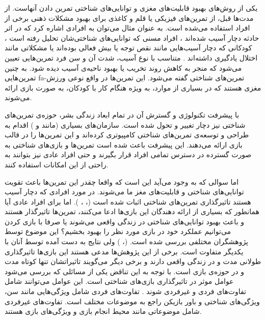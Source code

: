 \documentclass[twoside, a4paper,11pt]{book}
\numberwithin{equation}{chapter}
\numberwithin{table}{chapter}
\numberwithin{figure}{chapter}
\numberwithin{equation}{chapter}
\newcommand{\mls}[1]{\gls{fa-#1}\glsuseri{la-#1}}
\begin{document}
یکی از روش‌های بهبود قابلیت‌های مغزی و توانایی‌های شناختی تمرین دادن آنهاست. از مدت‌ها قبل، از تمرین‌های فیزیکی یا قلم و کاغذی برای بهبود مشکلات ذهنی برخی از افراد استفاده می‌شده است. به عنوان مثال می‌توان به افرادی اشاره کرد که در اثر حادثه دچار آسیب شده‌اند \cite{carney1999TBI}، افراد مسنی که توانایی‌های شناختی‌شان تحلیل رفته است \cite{rapp2002olderAdults}، کودکانی که دچار آسیب‌هایی مانند نقص توجه یا بیش فعالی بوده‌اند یا مشکلاتی مانند اختلال یادگیری داشته‌اند \cite{kimberly1999ADHDKids}. متناسب با نوع آسیب، شدت آن و سن فرد تمرین‌هایی تعیین می‌شود که منجر به کاهش روند تخریب یا بهبود ناحیه‌ی آسیب دیده شود. به چنین تمرین‌هایی  \mls{تمرین‌های شناختی} گفته می‌شود. این تمرین‌ها در واقع نوعی ورزش مغزی هستند که در بسیاری از موارد، به ویژه هنگام کار با کودکان، به صورت بازی ارائه می‌شوند.

با پیشرفت تکنولوژی و گسترش آن در تمام ابعاد زندگی بشر، حوزه‌ی تمرین‌های شناختی نیز دچار تغییر و تحول شده است. سازمان‌های بسیاری (مانند  و ) اقدام به طراحی و توسعه‌ی تمرین‌های شناختی کامپیوتری کرده‌اند و این تمرین‌ها را در قالب بازی ارائه می‌دهند. این پیشرفت باعث شده است تمرین‌ها و بازی‌های شناختی به صورت گسترده در دسترس تمامی افراد قرار بگیرند و حتی افراد عادی نیز بتوانند به راحتی از این امکانات استفاده کنند. 

اما سوالی که به وجود می‌آید این است که واقعا چقدر این تمرین‌ها باعث تقویت توانایی‌های شناختی و قابلیت‌های مغز ما می‌شوند. در مورد افرادی که دچار آسیب هستند تاثیرگذاری تمرین‌های شناختی اثبات شده است (\cite{carney1999TBI}، \cite{rapp2002olderAdults}، \cite{kimberly1999ADHDKids}). اما برای افراد عادی آیا همانطور که بسیاری از ارائه دهندگان این بازی‌ها ادعا می‌کنند، تمرین‌ها تاثیرگذار هستند و باعث بهبود توانایی‌های شناختی در زندگی واقعی می‌شوند یا صرفا با بازی کردن می‌توانیم عملکرد خود در بازی مورد نظر را بهبود بخشیم؟ این موضوع توسط پژوهشگران مختلفی بررسی شده است. (\cite{melby2013WM}، \cite{redick2013Intellig}) ولی نتایج به دست آمده توسط آنان با یکدیگر متفاوت است. برخی از این پژوهش‌ها مدعی هستند این بازی‌ها تاثیرگذاری طولانی مدت و در زندگی واقعی دارند و برخی دیگر می‌گویند تاثیراتشان تنها کوتاه مدت و در حوزه‌ی بازی است. با توجه به این تناقض یکی از مسائلی که بررسی می‌شود عوامل موثر در تاثیرگذاری بازی‌های شناختی است. این عوامل می‌توانند شامل تفاوت‌های فردی و غیرفردی شوند \cite{jaeggi2013IndiDiff}. تفاوت‌های فردی شامل ویژگی‌هایی مانند سن، ویژگی‌های شناختی و باور بازیکن راجع به موضوعات مختلف است. تفاوت‌های غیرفردی شامل موضوعاتی مانند محیط انجام بازی و ویژگی‌های بازی هستند.
\end{document}
